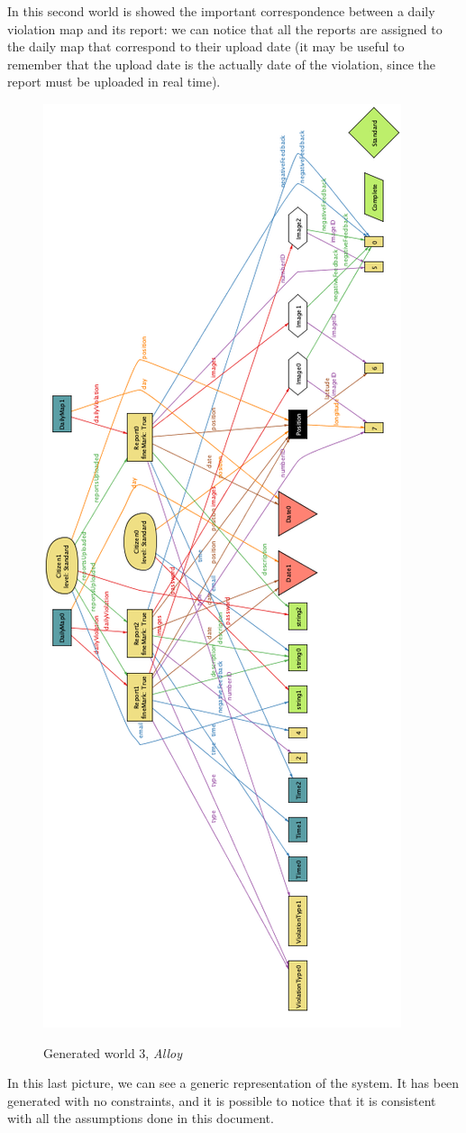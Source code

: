 \documentclass[../RASD.tex]{subfiles}
\begin{document}
    In this second world is showed the important correspondence between a daily violation map and its report:
    we can notice that all the reports are assigned to the daily map that correspond to their upload date
    (it may be useful to remember that the upload date is the actually date of the violation, since the report must be uploaded in real time).

    \begin{figure}[H]
        \centering
        \includegraphics[scale = 0.7]{assets/world3.png}\\
        \caption[Generated world 3, \textit{Alloy}]{Generated world 3, \textit{Alloy}}
    \end{figure}

    In this last picture, we can see a generic representation of the system.
    It has been generated with no constraints, and it is possible to notice that it is consistent with all the assumptions done in this document.
\end{document}
